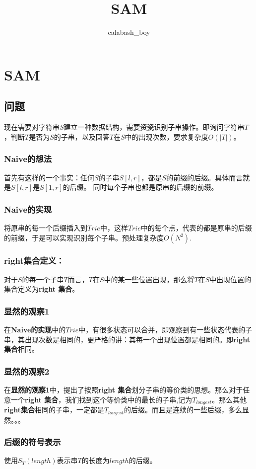 \documentclass[UTF8]{article}
\begin{document}
\title{SAM}
\author{calabash\_boy}
\chapter{SAM}
\maketitle
\section{问题}
现在需要对字符串$S$建立一种数据结构，需要资瓷识别子串操作。即询问字符串$T$，判断$T$是否为$S$的子串，以及回答$T$在$S$中的出现次数，要求复杂度$O(|T|)$。
\subsection{Naive的想法}
首先有这样的一个事实：任何$S$的子串$S[l,r]$，都是$S$的前缀的后缀。具体而言就是$S[l,r]$是$S[1,r]$的后缀。
同时每个子串也都是原串的后缀的前缀。
\subsection{Naive的实现}
将原串的每一个后缀插入到$Trie$中，这样$Trie$中的每个点，代表的都是原串的后缀的前缀，于是可以实现识别每个子串。预处理复杂度$O(N^2)$.
\subsection{right集合定义：}
对于$S$的每一个子串$T$而言，$T$在$S$中的某一些位置出现，那么将$T$在$S$中出现位置的集合定义为\textbf{right 集合}。
\subsection{显然的观察1}
在\textbf{Naive的实现}中的$Trie$中，有很多状态可以合并，即观察到有一些状态代表的子串，其出现次数是相同的，更严格的讲：其每一个出现位置都是相同的。即\textbf{right 集合}相同。
\subsection{显然的观察2}
在\textbf{显然的观察1}中，提出了按照\textbf{right 集合}划分子串的等价类的思想。那么对于任意一个\textbf{right 集合}，我们找到这个等价类中的最长的子串,记为$T_{longest}$。那么其他\textbf{right集合}相同的子串，一定都是$T_{longest}$的后缀。而且是连续的一些后缀，多么显然。。。
\subsection{后缀的符号表示}
使用$S_{T}(length)$表示串$T$的长度为$length$的后缀。
\end{document}

